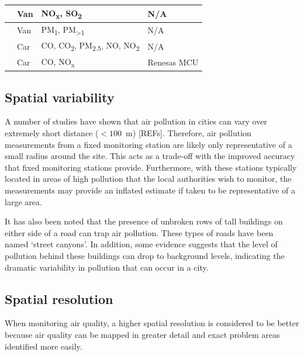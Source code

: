 \documentclass[11pt]{report}
\begin{document}
\begin{landscape}
\begin{longtable}{ p{} p{} p{} p{} }
  \cite{Wallace2009mobilehamilton} & Van & NO\textsubscript{x}, SO\textsubscript{2} & N/A \\ \midrule
  \cite{Weijers2004movingmeasurementunit} & Van & PM\textsubscript{1}, PM\textsubscript{\textgreater 1} & N/A \\ \midrule
  \cite{Westerdahl2005losangeles} & Car & CO, CO\textsubscript{2}, PM\textsubscript{2.5}, NO, NO\textsubscript{2} & N/A \\ \midrule
  \cite{Wong2009envmonitoringtemporal} & Car & CO, NO\textsubscript{x} & Renesas MCU \\ \bottomrule
  \hline
\end{longtable}

\end{landscape}


\subsection{Spatial variability}

A number of studies have shown that air pollution in cities can vary over extremely short distance ($ < 100$~m) [REFs]. Therefore, air pollution measurements from a fixed monitoring station are likely only representative of a small radius around the site. This acts as a trade-off with the improved accuracy that fixed monitoring stations provide. Furthermore, with these stations typically located in areas of high pollution that the local authorities wish to monitor, the measurements may provide an inflated estimate if taken to be representative of a large area.

It has also been noted that the presence of unbroken rows of tall buildings on either side of a road can trap air pollution. These types of roads have been named `street canyons'. In addition, some evidence suggests that the level of pollution behind these buildings can drop to background levels, indicating the dramatic variability in pollution that can occur in a city.

\subsection{Spatial resolution} \label{spatialres}

When monitoring air quality, a higher spatial resolution is considered to be better because air quality can be mapped in greater detail and exact problem areas identified more easily.
\end{document}
